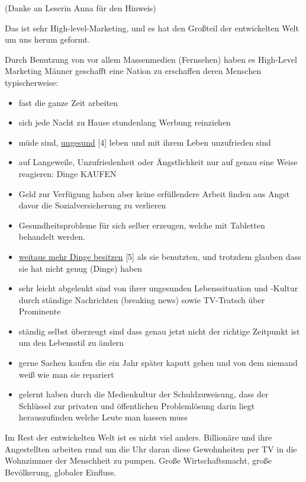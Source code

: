 \documentclass[10pt,a4paper,ngerman,twoside]{article} %
\begin{document}
\begin{multicols}{3}
(Danke an Leserin Anna für den Hinweis)

Das ist sehr High-level-Marketing, und es hat den Großteil der entwickelten Welt um uns herum geformt.

Durch Benutzung von vor allem Massenmedien (Fernsehen) haben es High-Level Marketing Männer geschafft eine Nation zu erschaffen deren Menschen typischerweise:

\begin{itemize}
\item fast die ganze Zeit arbeiten
\item sich jede Nacht zu Hause stundenlang Werbung reinziehen
\item müde sind, \href{http://www.raptitude.com/2010/10/being-healthy-is-not-normal/}{ungesund} [4] leben und mit ihrem Leben unzufrieden sind
\item auf Langeweile, Unzufriedenheit oder Ängstlichkeit nur auf genau eine Weise reagieren: Dinge KAUFEN
\item Geld zur Verfügung haben aber keine erfüllendere Arbeit finden aus Angst davor die Sozialversicherung zu verlieren
\item Gesundheitsprobleme für sich selber erzeugen, welche mit Tabletten behandelt werden.
\item \href{http://www.raptitude.com/2011/01/i-dont-want-stuff-any-more-only-things/}{weitaus mehr Dinge besitzen} [5] als sie benutzten, und trotzdem glauben dass sie hat nicht genug (Dinge) haben
\item sehr leicht abgelenkt sind von ihrer ungesunden Lebenssituation und -Kultur durch ständige Nachrichten (breaking news) sowie TV-Tratsch über Prominente
\item ständig selbst überzeugt sind dass genau jetzt nicht der richtige Zeitpunkt ist um den Lebensstil zu ändern
\item gerne Sachen kaufen die ein Jahr später kaputt gehen und von dem niemand weiß wie man sie repariert
\item gelernt haben durch die Medienkultur der Schuldzuweisung, dass der Schlüssel zur privaten und öffentlichen Problemlösung darin liegt herauszufinden welche Leute man hassen muss
\end{itemize}

Im Rest der entwickelten Welt ist es nicht viel anders. Billionäre und ihre Angestellten arbeiten rund um die Uhr daran diese Gewohnheiten per TV in die Wohnzimmer der Menschheit zu pumpen. Große Wirtschaftsmacht, große Bevölkerung, globaler Einfluss.


\end{multicols}
\end{document}

